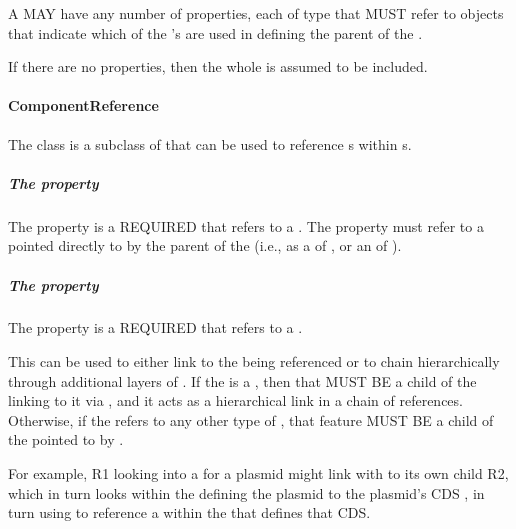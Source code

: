 A  MAY have any number of  properties, each of type  that MUST refer to   objects that indicate which  of the  's  are used in defining the parent of the .

If there are no  properties, then the whole  is assumed to be included. 


\paragraph{ComponentReference}
\label{sec:ComponentReference}

The  class is a subclass of  that can be used to reference s within s. 

\subparagraph{The  property}\label{sec:inChildOf}

The  property is a REQUIRED  that refers to a . 
The  property must refer to a  pointed directly to by the parent of the  (i.e., as a  of , or an  of ). 

\subparagraph{The  property}\label{sec:hasFeature:CR}

The  property is a REQUIRED  that refers to a .

This can be used to either link to the  being referenced or to chain hierarchically through additional layers of .
If the  is a , then that  MUST BE a child of the  linking to it via , and it acts as a hierarchical link in a chain of references.
Otherwise, if the  refers to any other type of , that feature MUST BE a child of the  pointed to by .

For example,  R1 looking into a  for a plasmid might link with  to its own child  R2, which in turn looks within the  defining the plasmid to the plasmid's CDS , in turn using  to reference a  within the  that defines that CDS.



